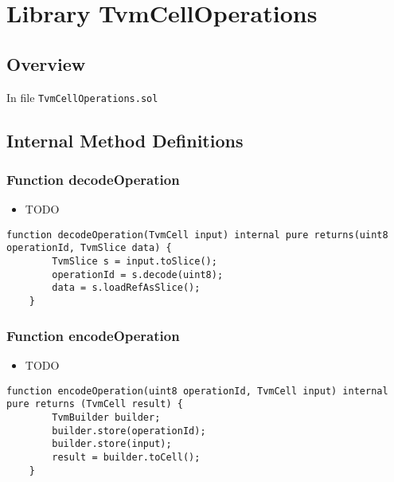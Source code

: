 
\chapter{Library TvmCellOperations}

\minitoc

\section{Overview}


In file {\tt TvmCellOperations.sol}

\section{Internal Method Definitions}


\subsection{Function decodeOperation}

\noindent\begin{itemize}
\item TODO
\end{itemize}

\begin{lstlisting}[firstnumber=4]
    function decodeOperation(TvmCell input) internal pure returns(uint8 operationId, TvmSlice data) {
        TvmSlice s = input.toSlice();
        operationId = s.decode(uint8);
        data = s.loadRefAsSlice();
    }
\end{lstlisting}

\subsection{Function encodeOperation}

\noindent\begin{itemize}
\item TODO
\end{itemize}

\begin{lstlisting}[firstnumber=10]
    function encodeOperation(uint8 operationId, TvmCell input) internal pure returns (TvmCell result) {
        TvmBuilder builder;
        builder.store(operationId);
        builder.store(input);
        result = builder.toCell();
    }
\end{lstlisting}
